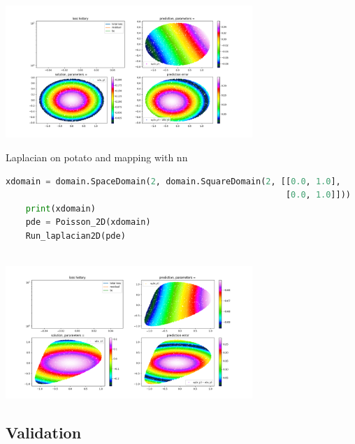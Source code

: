 \documentclass[12pt]{article}
\begin{document}
\begin{enumerate}
\begin{lstlisting}
\end{lstlisting}
\begin{frame}{}
    \begin{center}
        \includegraphics[width=0.7\textwidth]{images/scimbaplot3.png}
        \end{center}
\end{frame}
Laplacian on potato and mapping with nn
\begin{lstlisting}[language=Python,caption={},frame=single, backgroundcolor=\color{gray!10}, basicstyle=\footnotesize,rulecolor=\color{blue}, framexleftmargin=3pt, commentstyle=\color{mygreen}, keywordstyle=\color{blue}]
    xdomain = domain.SpaceDomain(2, domain.SquareDomain(2, [[0.0, 1.0], 
                                                        [0.0, 1.0]]))
    print(xdomain)
    pde = Poisson_2D(xdomain)
    Run_laplacian2D(pde)
    
\end{lstlisting}
\begin{frame}{}
    \begin{center}
        \includegraphics[width=0.7\textwidth]{images/scimbaplot4.png}

    \end{center}
\end{frame}
\newpage
\subsection{Validation}


\end{enumerate}
\end{document}
